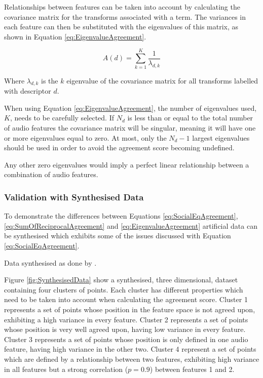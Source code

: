 			Relationships between features can be taken into account by calculating the covariance matrix for
			the transforms associated with a term. The variances in each feature can then be substituted with
			the eigenvalues of this matrix, as shown in Equation \ref{eq:EigenvalueAgreement}.

			\begin{equation}
				A(d) = \sum_{k = 1}^{K} \frac{1}{\lambda_{d,k}}
				\label{eq:EigenvalueAgreement}
			\end{equation}
			
			Where $\lambda_{d, k}$ is the $k$ eigenvalue of the covariance matrix for all transforms
			labelled with descriptor $d$.

			When using Equation \ref{eq:EigenvalueAgreement}, the number of eigenvalues used, $K$, needs to be
			carefully selected. If $N_{d}$ is less than or equal to the total number of audio features the
			covariance matrix will be singular, meaning it will have one or more eigenvalues equal to zero. At
			most, only the $N_{d} - 1$ largest eigenvalues should be used in order to avoid the agreement score
			becoming undefined.

			Any other zero eigenvalues would imply a perfect linear relationship between a combination of audio
			features. 

		\subsubsection*{Validation with Synthesised Data}
			To demonstrate the differences between Equations \ref{eq:SocialEqAgreement},
			\ref{eq:SumOfReciprocalAgreement} and \ref{eq:EigenvalueAgreement} artificial data can be
			synthesised which exhibits some of the issues discussed with Equation \ref{eq:SocialEqAgreement}.
			
			\note
			{
				Data synthesised as done by \citet{ripley1987stochastic}.
			}

			Figure \ref{fig:SynthesisedData} show a synthesised, three dimensional, dataset containing four
			clusters of points. Each cluster has different properties which need to be taken into account when
			calculating the agreement score. Cluster 1 represents a set of points whose position in the feature
			space is not agreed upon, exhibiting a high variance in every feature. Cluster 2 represents a set
			of points whose position is very well agreed upon, having low variance in every feature. Cluster 3
			represents a set of points whose position is only defined in one audio feature, having high
			variance in the other two. Cluster 4 represent a set of points which are defined by a relationship
			between two features, exhibiting high variance in all features but a strong correlation ($p = 0.9$)
			between features 1 and 2.

